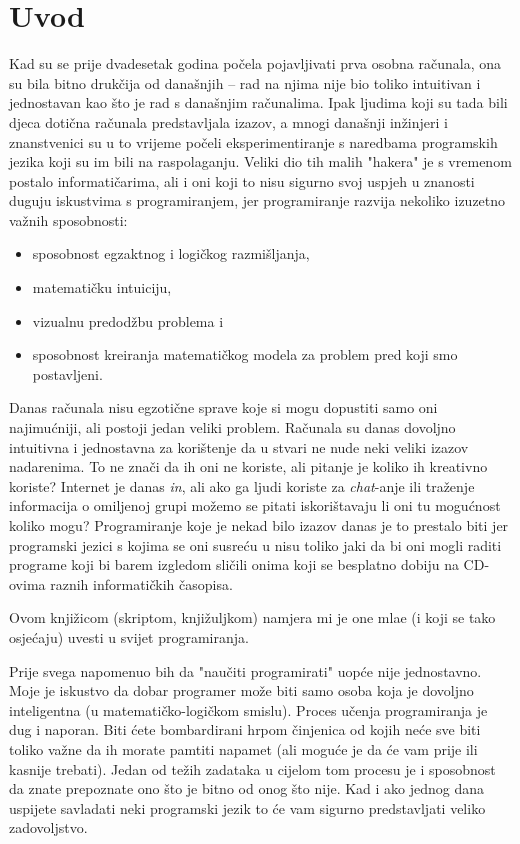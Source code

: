 \chapter*{Uvod}

Kad su se prije dvadesetak godina po\v cela pojavljivati prva osobna ra\v cunala, ona
su bila bitno druk\v cija od dana\v snjih -- rad na njima nije bio toliko intuitivan i
jednostavan kao \v sto je rad s dana\v snjim ra\v cunalima. Ipak ljudima koji su tada
bili djeca doti\v cna ra\v cunala predstavljala izazov, a mnogi dana\v snji
in\v zinjeri i znanstvenici su u to vrijeme po\v celi eksperimentiranje s naredbama
programskih jezika koji su im bili na raspolaganju. Veliki dio tih malih "hakera" je s
vremenom postalo informati\v carima, ali i oni koji to nisu sigurno svoj uspjeh u
znanosti duguju iskustvima s programiranjem, jer programiranje razvija nekoliko
izuzetno va\v znih sposobnosti:

\begin{itemize}
   \item sposobnost egzaktnog i logi\v ckog razmi\v sljanja,
   \item matemati\v cku intuiciju,
   \item vizualnu predod\v zbu problema i
   \item sposobnost kreiranja matemati\v ckog modela za problem pred koji smo
   posta\-vlje\-ni.
\end{itemize}

Danas ra\v{c}unala nisu egzoti\v{c}ne sprave koje si mogu dopustiti samo oni
najimu\'{c}niji, ali postoji jedan veliki problem.
Ra\v cunala su danas dovoljno intuitivna i jednostavna za kori\v stenje da u stvari ne
nude neki veliki izazov nadarenima. To ne zna\v ci da ih oni ne koriste, ali
pitanje je koliko ih kreativno koriste? Internet je danas \emph{in}, ali ako ga ljudi
koriste za \emph{chat}-anje ili tra\v zenje informacija o omiljenoj grupi mo\v zemo se
pitati iskori\v stavaju li oni tu mogu\'cnost koliko mogu? Programiranje koje je nekad
bilo izazov danas je to prestalo biti jer programski jezici s kojima se oni susre\' cu
u nisu toliko jaki da bi oni mogli raditi programe koji bi barem izgledom sli\v{c}ili
onima koji se besplatno dobiju na CD-ovima raznih informati\v ckih \v casopisa.

Ovom knji\v{z}icom (skriptom, knji\v{z}uljkom) namjera mi je one mla\dj{}e (i koji se
tako osje\'{c}aju)
uvesti u svijet programiranja. 

Prije svega napomenuo bih da "nau\v{c}iti programirati" uop\'{c}e nije jednostavno.
Moje je iskustvo da dobar programer mo\v{z}e biti samo osoba koja je dovoljno
inteligentna (u matemati\v{c}ko-logi\v{c}kom smislu). Proces u\v{c}enja programiranja
je dug i naporan. Biti \'{c}ete bombardirani hrpom \v{c}injenica od kojih ne\'{c}e sve
biti toliko va\v{z}ne da ih morate pamtiti napamet (ali mogu\'{c}e je da \'{c}e vam
prije ili kasnije trebati). Jedan od te\v{z}ih zadataka u cijelom tom procesu je i
sposobnost da znate prepoznate ono \v{s}to je bitno od onog \v{s}to nije.
Kad i ako jednog dana uspijete savladati neki programski jezik to \'{c}e vam
sigurno predstavljati veliko zadovoljstvo.

